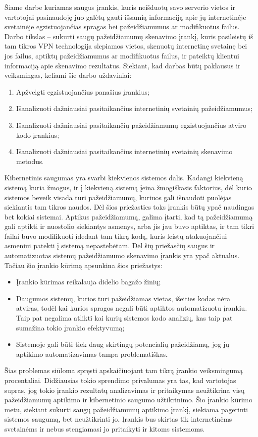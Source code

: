 Šiame darbe kuriamas saugus įrankis, kuris neišduotų savo serverio vietos ir vartotojai pasinaudoję juo galėtų gauti išsamią informaciją apie jų internetinėje svetainėje egzistuojančias spragas
bei pažeidžiamumus ar modifikuotus failus. Darbo tikslas – sukurti saugų pažeidžiamumų skenavimo įrankį, kuris pasileistų iš tam tikros VPN technologija slepiamos vietos, skenuotų internetinę
svetainę bei jos failus, aptiktų pažeidžiamumus ar modifikuotus failus, ir pateiktų klientui informaciją apie skenavimo rezultatus. Siekiant, kad darbas būtų paklausus ir veiksmingas, keliami šie
darbo uždaviniai:
\begin{enumerate}
	\item Apžvelgti egzistuojančius panašius įrankius;
	\item Išanalizuoti dažniausiai pasitaikančius internetinių svetainių pažeidžiamumus;
	\item Išanalizuoti dažniausiai pasitaikančių pažeidžiamumų egzistuojančius atviro kodo įrankius;
	\item Išanalizuoti dažniausiai pasitaikančius internetinių svetainių skenavimo metodus.
\end{enumerate}
Kibernetinis saugumas yra svarbi kiekvienos sistemos dalis. Kadangi kiekvieną sistemą kuria
žmogus, ir į kiekvieną sistemą įeina žmogiškasis faktorius, dėl kurio sistemos beveik visada turi
pažeidžiamumų, kuriuos gali išnaudoti puolėjas siekiantis tam tikros naudos. Dėl šios priežasties
toks įrankis būtų ypač naudingas bet kokiai sistemai. Aptikus pažeidžiamumą, galima įtarti, kad
tą pažeidžiamumą gali aptikti ir nuostolio siekiantys asmenys, arba jis jau buvo aptiktas, ir tam tikri
failai buvo modifikuoti įdedant tam tikrą kodą, kuris leistų atakuojančiui asmeniui patekti į sistemą
nepastebėtam.
Dėl šių priežasčių saugus ir automatizuotas sistemų pažeidžiamumo skenavimo įrankis yra
ypač aktualus. Tačiau šio įrankio kūrimą apsunkina šios priežastys:
\begin{itemize}
	\item Įrankio kūrimas reikalauja didelio bagažo žinių;
	\item Daugumos sistemų, kurios turi pažeidžiamas vietas, išeities kodas nėra atviras, todėl kai kurios spragos negali būti aptiktos automatizuotu įrankiu. Taip pat negalima atlikti kai kurių sistemos kodo analizių, kas taip pat sumažina tokio įrankio efektyvumą;
	\item Sistemoje gali būti tiek daug skirtingų potencialių pažeidžiamų, jog jų aptikimo automatizavimas tampa problematiškas.
\end{itemize}
Šias problemas siūloma spręsti apskaičiuojant tam tikrą įrankio veiksmingumą procentaliai.
Didžiausias tokio sprendimo privalumas yra tas, kad vartotojas supras, jog tokio įrankio rezultatų
analizavimas ir pritaikymas neužtikrina visų pažeidžiamumų aptikimo ir kibernetinio saugumo
užtikrinimo.
Šio įrankio kūrimo metu, siekiant sukurti saugų pažeidžiamumų aptikimo įrankį, siekiama pagerinti sistemos saugumą, bet neužtikrinti jo. Įrankis bus skirtas tik internetinėms svetainėms ir
nebus stengiamasi jo pritaikyti ir kitoms sistemoms.